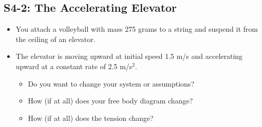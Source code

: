 \documentclass[]{article}
\begin{document}
\begin{PresentSpace}
\vspace{-10pt}
\section*{S4-2: The Accelerating Elevator}
\vspace{-10pt}
\begin{itemize}
	\item You attach a volleyball with mass 275 grams to a string and suspend it from the ceiling of an elevator.
	\item The elevator is moving upward at initial speed 1.5 m/s and accelerating upward at a constant rate of 2.5 m/s$^{2}$.
	\begin{itemize}
		\item Do you want to change your system or assumptions?
		\item How (if at all) does your free body diagram change?
		\item How (if at all) does the tension change?
	\end{itemize}
\end{itemize}
\end{PresentSpace}
\newpage
\end{document}
